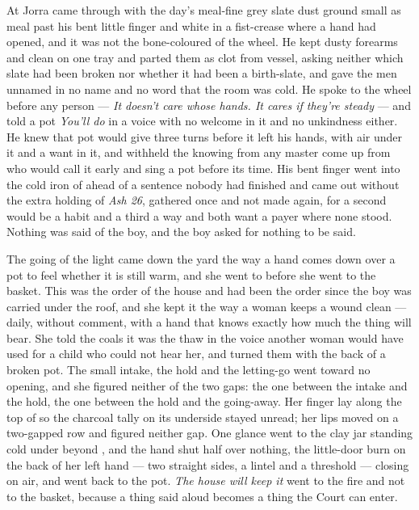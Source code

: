 At  Jorra came through  with the day's meal-fine grey slate dust ground small as meal past his bent little finger and white in a fist-crease where a hand had opened, and it was not the bone-coloured  of the wheel. He kept dusty forearms and clean on one tray and parted them as clot from vessel, asking neither which slate had been broken nor whether it had been a birth-slate, and gave the men unnamed in  no name and no word that the room was cold. He spoke to the wheel before any person --- \emph{It doesn't care whose hands. It cares if they're steady} --- and told a pot \emph{You'll do} in a voice with no welcome in it and no unkindness either. He knew  that pot would give three turns before it left his hands, with air under it and a want in it, and withheld the knowing from any master come up from  who would call it early and sing a pot before its time. His bent finger went into the cold iron of  ahead of a sentence nobody had finished and came out without the extra holding of \emph{Ash 26}, gathered once and not made again, for a second would be a habit and a third a way and both want a payer where none stood. Nothing was said of the boy, and the boy asked for nothing to be said.

\scenebreak

The going of the light came down the yard the way a hand comes down over a pot to feel whether it is still warm, and she went to  before she went to the basket. This was the order of the house and had been the order since the boy was carried under the roof, and she kept it the way a woman keeps a wound clean --- daily, without comment, with a hand that knows exactly how much the thing will bear. She told the coals it was the thaw in the voice another woman would have used for a child who could not hear her, and turned them with the back of a broken pot. The small intake, the hold and the letting-go went toward no opening, and she figured neither of the two gaps: the one between the intake and the hold, the one between the hold and the going-away. Her finger lay along the top of  so the charcoal tally on its underside stayed unread; her lips moved on a two-gapped row and figured neither gap. One glance went to the clay jar standing cold under  beyond , and the hand shut half over nothing, the little-door burn on the back of her left hand --- two straight sides, a lintel and a threshold --- closing on air, and went back to the pot. \emph{The house will keep it} went to the fire and not to the basket, because a thing said aloud becomes a thing the Court can enter.

